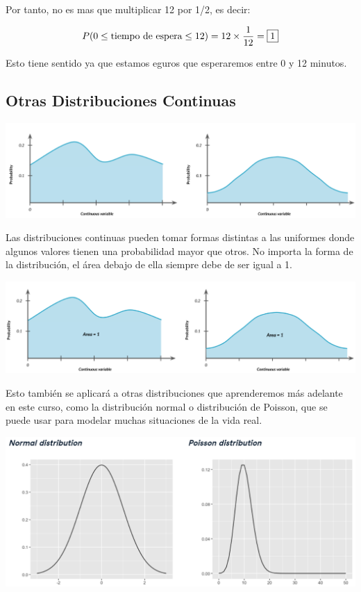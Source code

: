 \documentclass[
  letterpaper,
  DIV=11,
  numbers=noendperiod]{scrreprt}
\begin{document}
Por tanto, no es mas que multiplicar 12 por 1/2, es decir:

\[
P(0\leq \mbox{tiempo de espera}\leq 12) = 12\times \frac{1}{12} = \fbox{1}
\]

Esto tiene sentido ya que estamos eguros que esperaremos entre 0 y 12
minutos.

\hypertarget{otras-distribuciones-continuas}{%
\subsection{Otras Distribuciones
Continuas}\label{otras-distribuciones-continuas}}

\includegraphics{fig36.png}

Las distribuciones continuas pueden tomar formas distintas a las
uniformes donde algunos valores tienen una probabilidad mayor que otros.
No importa la forma de la distribución, el área debajo de ella siempre
debe de ser igual a 1.

\includegraphics{fig37.png}

Esto también se aplicará a otras distribuciones que aprenderemos más
adelante en este curso, como la distribución normal o distribución de
Poisson, que se puede usar para modelar muchas situaciones de la vida
real.

\includegraphics{fig38.png}
\end{document}
